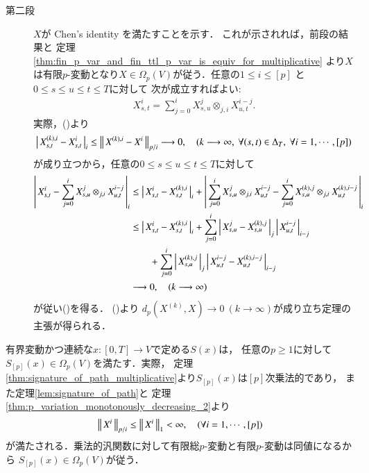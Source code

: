 \begin{prf}
\begin{description}
			\item[第二段] $X$が Chen's identity を満たすことを示す．
			これが示されれば，前段の結果と
			定理\ref{thm:fin_p_var_and_fin_ttl_p_var_is_equiv_for_multiplicative}
			より$X$は有限$p$-変動となり$X \in \Omega_p(V)$が従う．任意の$1 \leq i \leq [p]$
			と$0 \leq s \leq u \leq t \leq T$に対して
			次が成立すればよい:
			\begin{align}
				X^i_{s,t} = \sum_{j=0}^i X^j_{s,u} \otimes_{j,i} X^{i-j}_{u,t}.
				\label{eq:thm_p_rough_path_complete_dist_1}
			\end{align}
			実際，()より
			\begin{align}
				\compcrossnorm{X^{(k),i}_{s,t} - X^i_{s,t}}{i}
				\leq \Norm{X^{(k),i} - X^i}{p/i} \longrightarrow 0,
				\quad (k \longrightarrow \infty,\ \forall (s,t) \in \Delta_T,\ 
				\forall i = 1,\cdots,[p])
			\end{align}
			が成り立つから，任意の$0 \leq s \leq u \leq t \leq T$に対して
			\begin{align}
				\left|\, X^i_{s,t} - \sum_{j=0}^i X^j_{s,u} \otimes_{j,i} X^{i-j}_{u,t}\, \right|_{i}
				&\leq \left|\, X^i_{s,t} - X^{(k),i}_{s,t}\, \right|_{i}
					+ \left|\, \sum_{j=0}^i X^j_{s,u} \otimes_{j,i} X^{i-j}_{u,t} 
					- \sum_{j=0}^i X^{(k),j}_{s,u} \otimes_{j,i} X^{(k),i-j}_{u,t}\, \right|_{i} \\
				&\leq \left|\, X^i_{s,t} - X^{(k),i}_{s,t}\, \right|_{i}
					+ \sum_{j=0}^i \left|\, X^j_{s,u} - X^{(k),j}_{s,u}\, \right|_{j}
						\left|\, X^{i-j}_{u,t}\, \right|_{i-j} \\
					&\qquad + \sum_{j=0}^i \left|\, X^{(k),j}_{s,u}\, \right|_{j}
						\left|\, X^{i-j}_{u,t} - X^{(k),i-j}_{u,t}\, \right|_{i-j} \\
				&\longrightarrow 0,
				\quad (k \longrightarrow \infty)
			\end{align}
			が従い()を得る．
			()より
			$d_p(X^{(k)},X) \longrightarrow 0\ (k \longrightarrow \infty)$が成り立ち定理の主張が得られる．
			\QED
		\end{description}
	\end{prf}
	
	有界変動かつ連続な$x:[0,T] \longrightarrow V$で定める$S(x)$は，
	任意の$p \geq 1$に対して$S_{[p]}(x) \in \Omega_p(V)$を満たす．実際，
	定理\ref{thm:signature_of_path_multiplicative}より$S_{[p]}(x)$は$[p]$次乗法的であり，
	また定理\ref{lem:signature_of_path}と
	定理\ref{thm:p_variation_monotonously_decreasing_2}より
	\begin{align}
		\left\|\, X^i\, \right\|_{p/i} \leq \left\|\, X^i\, \right\|_{1} < \infty,
		\quad (\forall i = 1,\cdots,[p])
	\end{align}
	が満たされる．乗法的汎関数に対して有限総$p$-変動と有限$p$-変動は同値になるから
	$S_{[p]}(x) \in \Omega_p(V)$が従う．
	
